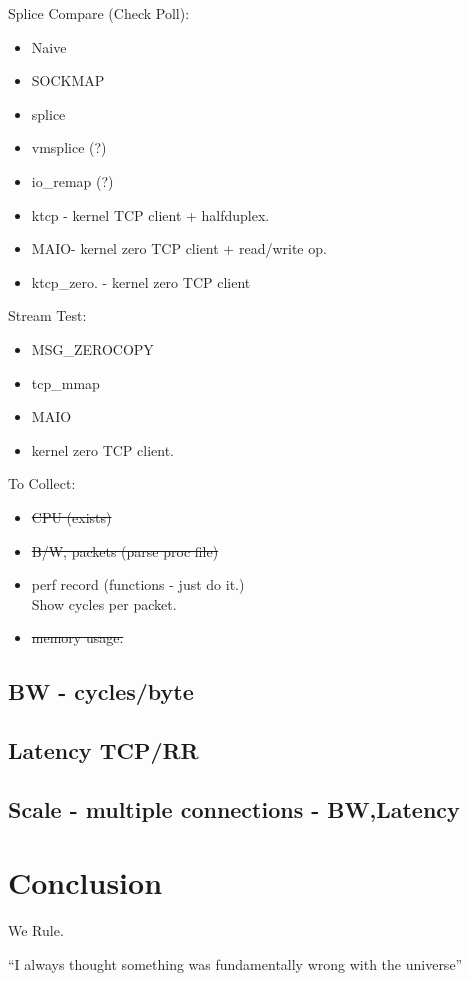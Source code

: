 \documentclass[newfonts=false,format=sigconf,9pt,letterpaper]{acmart}
\newcommand{\oursys}{MAIO\xspace}
\begin{document}
Splice Compare (Check Poll):
\begin{itemize}
    \item Naive
    \item SOCKMAP
    \item splice
    \item vmsplice  (?)
    \item io\_remap (?)
    \item ktcp - kernel TCP client + halfduplex.
    \item \oursys - kernel zero TCP client + read/write op. 
    \item ktcp\_zero. - kernel zero TCP client
\end{itemize}
\smallskip
Stream Test:
\begin{itemize}
    \item MSG\_ZEROCOPY
    \item tcp\_mmap
    \item \oursys
    \item kernel zero TCP client.
\end{itemize}
\smallskip
To Collect:
\begin{itemize}
    \item \st{CPU (exists)}
    \item \st{B/W, packets (parse proc file)}
    \item perf record (functions - just do it.)\\
    Show cycles per packet.
    \item \st{memory usage.}
\end{itemize}
\subsection{BW - cycles/byte}
\subsection{Latency TCP/RR}
\subsection{Scale - multiple connections - BW,Latency}

\section{Conclusion}
We Rule.

``I always thought something was fundamentally wrong with the universe'' \citep{adams1995hitchhiker}



\end{document}
